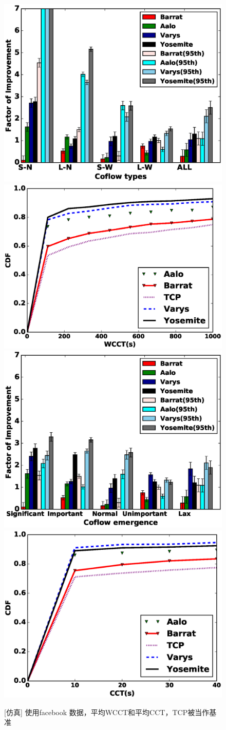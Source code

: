 \begin{figure}[h]
  \centering%
    {\includegraphics[width=0.5\columnwidth]{figures/Yosemite/figs/evaluation/ex2/weight_real_type.eps}}%
      {\includegraphics[width=0.5\columnwidth]{figures/Yosemite/figs/evaluation/ex2/weight_CDF_compare.eps}}
    {\includegraphics[width=0.5\columnwidth]{figures/Yosemite/figs/evaluation/ex2/nfake1.eps}}%
      {\includegraphics[width=0.5\columnwidth]{figures/Yosemite/figs/evaluation/ex2/CDF_compare.eps}}
  \caption{[仿真] 使用facebook 数据，平均WCCT和平均CCT，TCP被当作基准}
  \label{Yosemite-evaluation_facebook_fig}
\end{figure}

